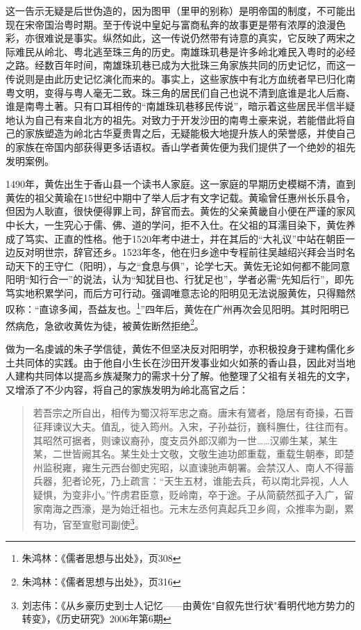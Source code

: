 这一告示无疑是后世伪造的，因为图甲（里甲的别称）是明帝国的制度，不可能出现在宋帝国治粤时期。至于传说中皇妃与富商私奔的故事更是带有浓厚的浪漫色彩，亦很难说是事实。纵然如此，这一传说仍然带有诗意的真实，它反映了两宋之际难民从岭北、粤北逃至珠三角的历史。南雄珠玑巷是许多岭北难民入粤时的必经之路。经数百年时间，南雄珠玑巷已成为大批珠三角家族共同的历史记忆，而这一传说则是由此历史记忆演化而来的。事实上，这些家族中有北方血统者早已归化南粤文明，变得与粤人毫无二致。珠三角的居民们自己也说不清到底谁是北人后裔、谁是南粤土著。只有口耳相传的“南雄珠玑巷移民传说”，暗示着这些居民半信半疑地认为自己有来自北方的祖先。对致力于开发沙田的南粤土豪来说，若能借此将自己的家族塑造为岭北古华夏贵胄之后，无疑能极大地提升族人的荣誉感，并使自己的家族在帝国内部获得更多话语权。香山学者黄佐便为我们提供了一个绝妙的祖先发明案例。

1490年，黄佐出生于香山县一个读书人家庭。这一家庭的早期历史模糊不清，直到黄佐的祖父黄瑜在15世纪中期中了举人后才有文字记载。黄瑜曾任惠州长乐县令，但因为人耿直，很快便得罪上司，辞官而去。黄佐的父亲黄畿自小便在严谨的家风中长大，一生究心于儒、佛、道的学问，拒不入仕。在父祖的耳濡目染下，黄佐养成了笃实、正直的性格。他于1520年考中进士，并在其后的“大礼议”中站在朝臣一边反对明世宗，辞官还乡。1523年冬，他在归乡途中专程前往吴越绍兴拜会当时名动天下的王守仁（阳明），与之“食息与俱”，论学七天。黄佐无论如何都不能同意阳明“知行合一”的说法，认为“知犹目也、行犹足也”，学者必需“先知后行”，即先笃实地积累学问，而后方可行动。强调唯意志论的阳明见无法说服黄佐，只得黯然叹称：“直谅多闻，吾益友也。\footnote{朱鸿林：《儒者思想与出处》，页308}”四年后，黄佐在广州再次会见阳明。其时阳明已然病危，急欲收黄佐为徒，被黄佐断然拒绝\footnote{朱鸿林：《儒者思想与出处》，页316}。

做为一名虔诚的朱子学信徒，黄佐不但坚决反对阳明学，亦积极投身于建构儒化乡土共同体的实践。由于他自小生长在沙田开发事业如火如荼的香山县，因此对当地人建构共同体以提高乡族凝聚力的需求十分了解。他整理了父祖有关祖先的文字，又增添了不少内容，将自己的家族发明为岭北高官之后：

\begin{quote}

若吾宗之所自出，相传为蜀汉将军忠之裔。唐末有鷟者，隐居有奇操，石晋征拜谏议大夫。值乱，徙入筠州。入宋，子孙益衍，巍科膴仕，往往而有。其昭然可据者，则谏议裔孙，度支员外郎汉卿为一世……汉卿生某，某生某，二世皆阙其名。某生处士文敬，文敬生迪功郎重载，重载生朝奉，即楚州监税雍，雍生元西台御史宪昭，以直谏驰声朝署。会禁汉人、南人不得蓄兵器，犯者论死，乃上疏言：“天生五材，谁能去兵，苟以南北异视，人人疑惧，为变非小。”忤虏君臣意，贬岭南，卒于途。子从简藐然孤孑入广，留家南海之西濠，是为始迁祖也。元末左丞何真起兵卫乡闾，众推率为副，累有功，官至宣慰司副使\footnote{刘志伟：《从乡豪历史到士人记忆——由黄佐"自叙先世行状"看明代地方势力的转变》，《历史研究》2006年第6期}。

\end{quote}

